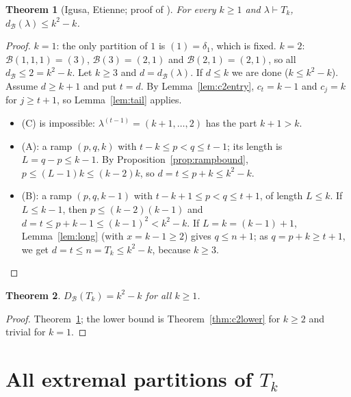 \documentclass[11pt]{article}
\newtheorem{theorem}{Theorem}[section]
\theoremstyle{definition}
\newcommand{\B}{\mathcal{B}}
\newcommand{\dB}{d_{\mathcal{B}}}
\newcommand{\DB}{D_{\mathcal{B}}}
\renewcommand{\le}{\leqslant}
\renewcommand{\ge}{\geqslant}
\begin{document}
\begin{theorem}[Igusa, Etienne; proof of {\cite[Thm.~3.7]{GH}}]\label{thm:c2upper}
For every $k\ge1$ and $\lambda\vdash T_k$, $\dB(\lambda)\le k^2-k$.
\end{theorem}
\begin{proof}
$k=1$: the only partition of $1$ is $(1)=\delta_1$, which is fixed.  $k=2$: $\B(1,1,1)=(3)$,
$\B(3)=(2,1)$ and $\B(2,1)=(2,1)$, so all $\dB\le2=k^2-k$.  Let $k\ge3$ and $d=\dB(\lambda)$.  If $d\le k$
we are done ($k\le k^2-k$).  Assume $d\ge k+1$ and put $t=d$.  By Lemma~\ref{lem:c2entry}, $c_t=k-1$ and
$c_j=k$ for $j\ge t+1$, so Lemma~\ref{lem:tail} applies.
\begin{itemize}
\item (C) is impossible: $\lambda^{(t-1)}=(k+1,\dots,2)$ has the part $k+1>k$.
\item (A): a ramp $(p,q,k)$ with $t-k\le p<q\le t-1$; its length is $L=q-p\le k-1$.  By
Proposition~\ref{prop:rampbound}, $p\le(L-1)k\le(k-2)k$, so $d=t\le p+k\le k^2-k$.
\item (B): a ramp $(p,q,k-1)$ with $t-k+1\le p<q\le t+1$, of length $L\le k$.  If $L\le k-1$, then
$p\le(k-2)(k-1)$ and $d=t\le p+k-1\le(k-1)^2<k^2-k$.  If $L=k=(k-1)+1$, Lemma~\ref{lem:long} (with
$x=k-1\ge2$) gives $q\le n+1$; as $q=p+k\ge t+1$, we get $d=t\le n=T_k\le k^2-k$, because $k\ge3$.
\end{itemize}
\end{proof}

\begin{theorem}\label{thm:c2main}
$\DB(T_k)=k^2-k$ for all $k\ge1$.
\end{theorem}
\begin{proof}
Theorem~\ref{thm:c2upper}; the lower bound is Theorem~\ref{thm:c2lower} for $k\ge2$ and trivial for $k=1$.
\end{proof}

\section{All extremal partitions of $T_k$}\label{sec:c2ext}
\end{document}
